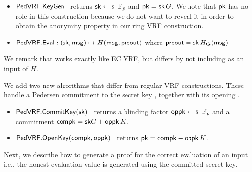 %

\begin{itemize}
\item ${\mathsf{PedVRF}}.{\mathsf{KeyGen}}$ \, returns $\sk \leftsample \F_p$ and $\mathsf{pk} = \mathsf{sk} \, G$.
We note that $ \mathsf{pk} $ has no role in this construction because we do not want to reveal it in order to obtain the anonymity property in our ring VRF construction. %

\item ${\mathsf{PedVRF}}.{\mathsf{Eval}} : (\mathsf{sk},\mathsf{msg}) \mapsto H(\mathsf{msg}, {\mathsf{preout}})$ where $ {\mathsf{preout}} =  \mathsf{sk} \, H_{{\mathbf{G}}}(\mathsf{msg})$
\end{itemize}



We remark that \KeyGen works exactly like EC VRF, but \Eval differs by not including \pk as an input of $ H $.

 We add two new algorithms that differ from regular VRF constructions.
These handle a Pedersen commitment to the secret key \sk,
 together with its opening \openpk.
\begin{itemize}
\item ${\mathsf{PedVRF}}.{\mathsf{CommitKey}}(\mathsf{sk})$ \, %
returns a blinding factor $\openpk \leftsample \F_p$
and a commitment $\mathsf{compk} = \mathsf{sk} G + \mathsf{oppk} \, K$.
\item ${\mathsf{PedVRF}}.{\mathsf{OpenKey}}(\mathsf{compk},\mathsf{oppk})$ \,
returns $\mathsf{pk} = \mathsf{compk} - \mathsf{oppk} \, K$.
\end{itemize}

Next, we describe how to generate a proof for the correct evaluation of an input i.e., the honest evaluation value is generated using the committed secret key.


